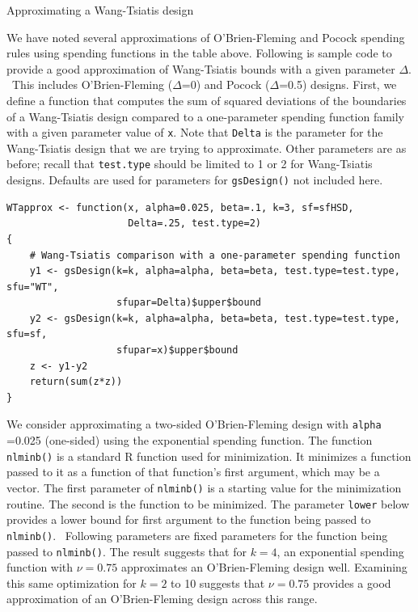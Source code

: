 \begin{example}
Approximating a Wang-Tsiatis design
\end{example}

We have noted several approximations of O'Brien-Fleming and Pocock spending
rules using spending functions in the table above. Following is sample code to
provide a good approximation of Wang-Tsiatis bounds with a given parameter
$\Delta$. \ This includes O'Brien-Fleming ($\Delta$=0) and Pocock ($\Delta
$=0.5) designs. First, we define a function that computes the sum of squared
deviations of the boundaries of a Wang-Tsiatis design compared to a
one-parameter spending function family with a given parameter value of
\texttt{x}. Note that \texttt{Delta} is the parameter for the Wang-Tsiatis
design that we are trying to approximate. Other parameters are as before;
recall that \texttt{test.type} should be limited to 1 or 2 for Wang-Tsiatis
designs. Defaults are used for parameters for \texttt{gsDesign()} not included here.

\bigskip

\begin{verbatim}
WTapprox <- function(x, alpha=0.025, beta=.1, k=3, sf=sfHSD, 
                     Delta=.25, test.type=2)
{
    # Wang-Tsiatis comparison with a one-parameter spending function
    y1 <- gsDesign(k=k, alpha=alpha, beta=beta, test.type=test.type, sfu="WT",
                   sfupar=Delta)$upper$bound
    y2 <- gsDesign(k=k, alpha=alpha, beta=beta, test.type=test.type, sfu=sf,
                   sfupar=x)$upper$bound
    z <- y1-y2
    return(sum(z*z))
}
\end{verbatim}
\bigskip

We consider approximating a two-sided O'Brien-Fleming design with \texttt{alpha}%
=0.025 (one-sided) using the exponential spending function. The function
\texttt{nlminb()} is a standard R function used for minimization. It minimizes
a function passed to it as a function of that function's first 
argument, which may be a vector. The first parameter of \texttt{nlminb()} is 
a starting value for the minimization routine. The second is the function to be
minimized. The parameter \texttt{lower} below provides a lower bound for first
argument to the function being passed to \texttt{nlminb()}. \ Following
parameters are fixed parameters for the function being passed to
\texttt{nlminb()}. The result suggests that for $k=4$, an exponential spending
function with $\nu=0.75$ approximates an O'Brien-Fleming design well.
Examining this same optimization for $k=2$ to 10 suggests that $\nu=0.75$
provides a good approximation of an O'Brien-Fleming design across this range.

